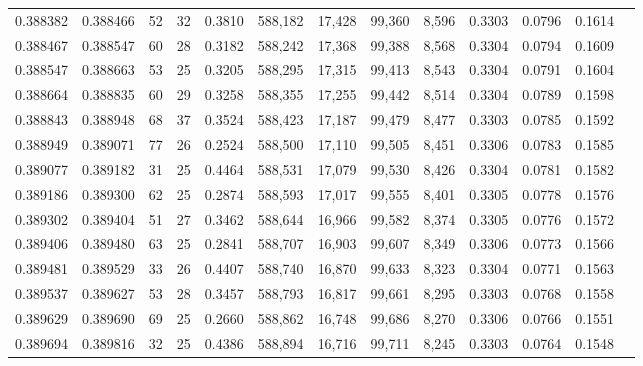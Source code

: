 \begin{tabular}{rrrrrrrrrrrrr}
0.388382 & 0.388466 &    52 &  32 &                                     0.3810 & 588,182 &  17,428 &  99,360 &   8,596 & 0.3303 & 0.0796 & 0.1614 \\
0.388467 & 0.388547 &    60 &  28 &                                     0.3182 & 588,242 &  17,368 &  99,388 &   8,568 & 0.3304 & 0.0794 & 0.1609 \\
0.388547 & 0.388663 &    53 &  25 &                                     0.3205 & 588,295 &  17,315 &  99,413 &   8,543 & 0.3304 & 0.0791 & 0.1604 \\
0.388664 & 0.388835 &    60 &  29 &                                     0.3258 & 588,355 &  17,255 &  99,442 &   8,514 & 0.3304 & 0.0789 & 0.1598 \\
0.388843 & 0.388948 &    68 &  37 &                                     0.3524 & 588,423 &  17,187 &  99,479 &   8,477 & 0.3303 & 0.0785 & 0.1592 \\
0.388949 & 0.389071 &    77 &  26 &                                     0.2524 & 588,500 &  17,110 &  99,505 &   8,451 & 0.3306 & 0.0783 & 0.1585 \\
0.389077 & 0.389182 &    31 &  25 &                                     0.4464 & 588,531 &  17,079 &  99,530 &   8,426 & 0.3304 & 0.0781 & 0.1582 \\
0.389186 & 0.389300 &    62 &  25 &                                     0.2874 & 588,593 &  17,017 &  99,555 &   8,401 & 0.3305 & 0.0778 & 0.1576 \\
0.389302 & 0.389404 &    51 &  27 &                                     0.3462 & 588,644 &  16,966 &  99,582 &   8,374 & 0.3305 & 0.0776 & 0.1572 \\
0.389406 & 0.389480 &    63 &  25 &                                     0.2841 & 588,707 &  16,903 &  99,607 &   8,349 & 0.3306 & 0.0773 & 0.1566 \\
0.389481 & 0.389529 &    33 &  26 &                                     0.4407 & 588,740 &  16,870 &  99,633 &   8,323 & 0.3304 & 0.0771 & 0.1563 \\
0.389537 & 0.389627 &    53 &  28 &                                     0.3457 & 588,793 &  16,817 &  99,661 &   8,295 & 0.3303 & 0.0768 & 0.1558 \\
0.389629 & 0.389690 &    69 &  25 &                                     0.2660 & 588,862 &  16,748 &  99,686 &   8,270 & 0.3306 & 0.0766 & 0.1551 \\
0.389694 & 0.389816 &    32 &  25 &                                     0.4386 & 588,894 &  16,716 &  99,711 &   8,245 & 0.3303 & 0.0764 & 0.1548 \\

\end{tabular}
